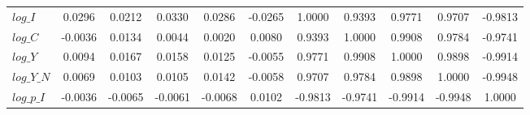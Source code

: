 \begin{center}
\begin{longtable}{lcccccccccc}
$log\_I          $	 & 	            0.0296	 & 	            0.0212	 & 	            0.0330	 & 	            0.0286	 & 	           -0.0265	 & 	            1.0000	 & 	            0.9393	 & 	            0.9771	 & 	            0.9707	 & 	           -0.9813 \\ 
$log\_C          $	 & 	           -0.0036	 & 	            0.0134	 & 	            0.0044	 & 	            0.0020	 & 	            0.0080	 & 	            0.9393	 & 	            1.0000	 & 	            0.9908	 & 	            0.9784	 & 	           -0.9741 \\ 
$log\_Y          $	 & 	            0.0094	 & 	            0.0167	 & 	            0.0158	 & 	            0.0125	 & 	           -0.0055	 & 	            0.9771	 & 	            0.9908	 & 	            1.0000	 & 	            0.9898	 & 	           -0.9914 \\ 
$log\_Y\_N       $	 & 	            0.0069	 & 	            0.0103	 & 	            0.0105	 & 	            0.0142	 & 	           -0.0058	 & 	            0.9707	 & 	            0.9784	 & 	            0.9898	 & 	            1.0000	 & 	           -0.9948 \\ 
$log\_p\_I       $	 & 	           -0.0036	 & 	           -0.0065	 & 	           -0.0061	 & 	           -0.0068	 & 	            0.0102	 & 	           -0.9813	 & 	           -0.9741	 & 	           -0.9914	 & 	           -0.9948	 & 	            1.0000 \\ 
\end{longtable}
 \end{center}
